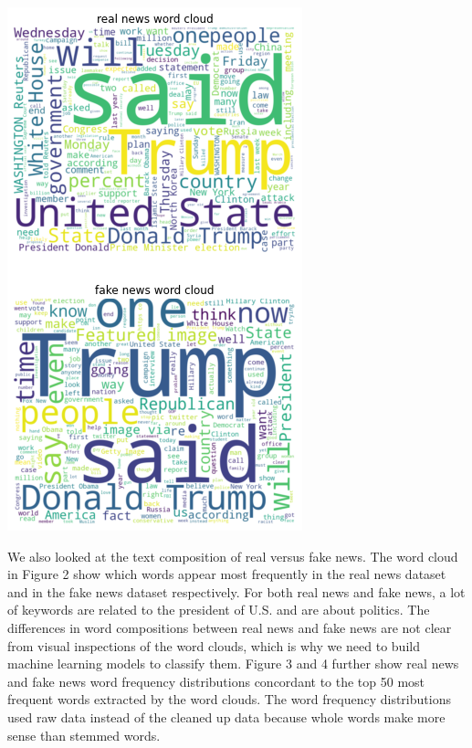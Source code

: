 \documentclass{article}
\begin{document}
\begin{multicols}{2}
\begin{center}
\includegraphics[scale=0.45]{images/wd2.png}
\newline
\caption{Figure 2. Text composition of real Vs. fake news}
\end{center}

We also looked at the text composition of real versus fake news. The word cloud in Figure 2 show which words appear most frequently in the real news dataset and in the fake news dataset respectively. For both real news and fake news, a lot of keywords are related to the president of U.S. and are about politics. The differences in word compositions between real news and fake news are not clear from visual inspections of the word clouds, which is why we need to build machine learning models to classify them. Figure 3 and 4 further show real news and fake news word frequency distributions concordant to the top 50 most frequent words extracted by the word clouds. The word frequency distributions used raw data instead of the cleaned up data because whole words make more sense than stemmed words.


\end{multicols}
\end{document}
